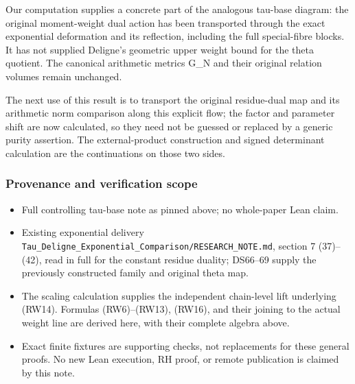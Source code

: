 \documentclass{article}
\begin{document}
Our computation supplies a concrete part of the analogous tau-base diagram: the original moment-weight dual action has been transported through the exact exponential deformation and its reflection, including the full special-fibre blocks. It has not supplied Deligne's geometric upper weight bound for the theta quotient. The canonical arithmetic metrics G\_N and their original relation volumes remain unchanged.

The next use of this result is to transport the original residue-dual map and its arithmetic norm comparison along this explicit flow; the factor and parameter shift are now calculated, so they need not be guessed or replaced by a generic purity assertion. The external-product construction and signed determinant calculation are the continuations on those two sides.

\subsubsection{Provenance and verification scope}\label{endpoint-f1_reflection--provenance-and-verification-scope}

\begin{itemize}
\tightlist
\item
  Full controlling tau-base note as pinned above; no whole-paper Lean claim.
\item
  Existing exponential delivery \nolinkurl{Tau_Deligne_Exponential_Comparison/RESEARCH_NOTE.md}, section 7 (37)--(42), read in full for the constant residue duality; DS66--69 supply the previously constructed family and original theta map.
\item
  The scaling calculation supplies the independent chain-level lift underlying (RW14). Formulas (RW6)--(RW13), (RW16), and their joining to the actual weight line are derived here, with their complete algebra above.
\item
  Exact finite fixtures are supporting checks, not replacements for these general proofs. No new Lean execution, RH proof, or remote publication is claimed by this note.
\end{itemize}

\endgroup
\end{document}
